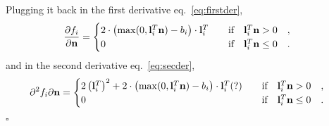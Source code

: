 Plugging it back in the first derivative eq.~\eqref{eq:firstder},
\begin{equation}
\frac{\partial f_i}{\partial {\bf n}} = \begin{cases}
2 \cdot \left( \max(0, \mathbf{l}_i^T \mathbf{n}) - b_i \right) \cdot \mathbf{l}_i^T  \qquad\text{if} \quad \mathbf{l}_i^T \mathbf{n} > 0 \quad, \\
0 \hfill  \qquad\text{if} \quad \mathbf{l}_i^T \mathbf{n} \leq 0 \quad.
\end{cases} \\
\end{equation}
and in the second derivative eq.~\eqref{eq:secder},
\begin{equation}
{\partial ^2 f_i}{\partial {\bf n}} = \begin{cases}
2 \left( \mathbf{l}_i^T \right) ^2 + 2 \cdot \left( \max(0, \mathbf{l}_i^T \mathbf{n}) - b_i \right) \cdot \mathbf{l}_i^T (?)  \qquad\text{if} \quad \mathbf{l}_i^T \mathbf{n} > 0 \quad, \\
0 \hfill  \qquad\text{if} \quad \mathbf{l}_i^T \mathbf{n} \leq 0 \quad.
\end{cases} \\
\end{equation}



\null\hfill$\square$

